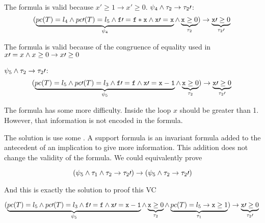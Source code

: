 	The formula is valid because $x\prime \geq 1 \to x\prime \geq 0$.
	\; $\psi_4 \wedge \tau_2 \to \tau_2\prime $:	
	\begin{equation*}
		(
			\underbrace{pc(T) = l_4 \wedge pc\prime (T) = l_5 \wedge \mathtt{f}\prime  = \mathtt{f*x} \wedge \mathtt{x\prime =x}}_{\psi_4} \wedge \underbrace{\mathtt{x} \geq 0}_{\tau_2}
		) 
			\to \underbrace{\mathtt{x}\prime  \geq 0}_{\tau_2\prime }\\\\
	\end{equation*}


	The formula is valid because of the congruence of equality used in  $x\prime =x \wedge x\geq 0 \to x\prime \geq 0$ 

	\; $\psi_5 \wedge \tau_2 \to \tau_2\prime $:	
	\begin{equation*}
		(
			\underbrace{pc(T) = l_5 \wedge pc\prime (T) = l_3 \wedge \mathtt{f\prime =f} \wedge \mathtt{x\prime =x-1}}_{\psi_5} \wedge \underbrace{\mathtt{x} \geq 0}_{\tau_2}
		) 
			\to \underbrace{\mathtt{x}\prime  \geq 0}_{\tau_2\prime }\\\\
	\end{equation*}


	The formula has some more difficulty. 
	Inside the loop $x$ should be greater than 1.
	However, that information is not encoded in the formula.
	
	The solution is use some .
	A support formula is an invariant formula added to the antecedent of an implication to give more information. 
	This addition does not change the validity of the formula.
	We could equivalently prove

	\[
		(\psi_5 \wedge \tau_1 \wedge \tau_2 \to \tau_2\prime ) \rightarrow (\psi_5\wedge \tau_2\to\tau_2\prime )
	\]

	And this is exactly the solution to proof this \gls{VC}

	

	\begin{equation*}
		(
			\underbrace{pc(T) = l_5 \wedge pc\prime (T) = l_3 \wedge \mathtt{f\prime =f} \wedge \mathtt{x\prime =x-1}}_{\psi_5} \wedge \underbrace{\mathtt{x} \geq 0}_{\tau_2} \wedge \underbrace{pc(T) = l_5 \to \mathtt{x} \geq 1}_{\tau_1}
		) 
			\to \underbrace{\mathtt{x}\prime  \geq 0}_{\tau_2\prime }\\\\
	\end{equation*}



